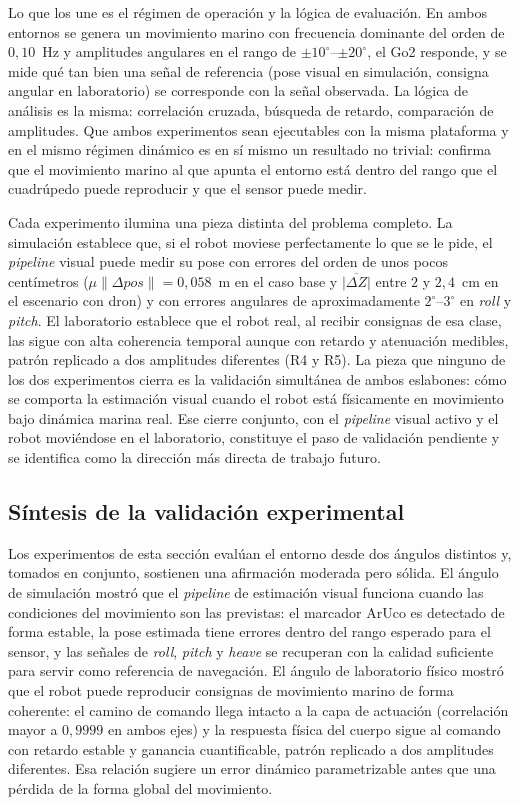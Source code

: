 \documentclass[12pt,a4paper]{report}
\begin{document}
Lo que los une es el régimen de operación y la lógica de evaluación. En ambos
entornos se genera un movimiento marino con frecuencia dominante del orden de
\(0{,}10\)~Hz y amplitudes angulares en el rango de
\({\pm}10^\circ\)--\({\pm}20^\circ\), el Go2 responde, y se mide qué tan bien
una señal de referencia (pose visual en simulación, consigna angular en
laboratorio) se corresponde con la señal observada. La lógica de análisis es
la misma: correlación cruzada, búsqueda de retardo, comparación de amplitudes. Que
ambos experimentos sean ejecutables con la misma plataforma y en el mismo
régimen dinámico es en sí mismo un resultado no trivial: confirma que el
movimiento marino al que apunta el entorno está dentro del rango que el
cuadrúpedo puede reproducir y que el sensor puede medir.

Cada experimento ilumina una pieza distinta del problema completo. La
simulación establece que, si el robot moviese perfectamente lo que se le pide,
el \textit{pipeline} visual puede medir su pose con errores del orden de unos pocos
centímetros (\(\mu\|\Delta pos\|=0{,}058\)~m en el caso base y
\(\overline{|\Delta Z|}\) entre \(2\) y \(2{,}4\)~cm en el escenario con
dron) y con errores angulares de aproximadamente
\(2^\circ\)--\(3^\circ\) en \emph{roll} y \emph{pitch}. El laboratorio
establece que el robot real, al recibir consignas de esa clase, las sigue con
alta coherencia temporal aunque con retardo y atenuación medibles, patrón
replicado a dos amplitudes diferentes (R4 y R5). La pieza que ninguno de los dos experimentos
cierra es la validación simultánea de ambos eslabones: cómo se comporta la
estimación visual cuando el robot está físicamente en movimiento bajo dinámica
marina real. Ese cierre conjunto, con el \textit{pipeline} visual activo y el robot
moviéndose en el laboratorio, constituye el paso de validación pendiente y se
identifica como la dirección más directa de trabajo futuro.

\subsection{Síntesis de la validación experimental}

Los experimentos de esta sección evalúan el entorno desde dos ángulos
distintos y, tomados en conjunto, sostienen una afirmación moderada pero
sólida. El ángulo de simulación mostró que el \textit{pipeline} de estimación visual
funciona cuando las condiciones del movimiento son las previstas: el marcador
ArUco es detectado de forma estable, la pose estimada tiene errores dentro del
rango esperado para el sensor, y las señales de \emph{roll}, \emph{pitch} y \emph{heave} se
recuperan con la calidad suficiente para servir como referencia de navegación.
El ángulo de laboratorio físico mostró que el robot puede reproducir consignas
de movimiento marino de forma coherente: el camino de comando llega intacto a
la capa de actuación (correlación mayor a \(0{,}9999\) en ambos ejes) y la respuesta física
del cuerpo sigue al comando con retardo estable y ganancia cuantificable, patrón
replicado a dos amplitudes diferentes. Esa relación sugiere un error dinámico
parametrizable antes que una pérdida de la forma global del movimiento.
\end{document}

